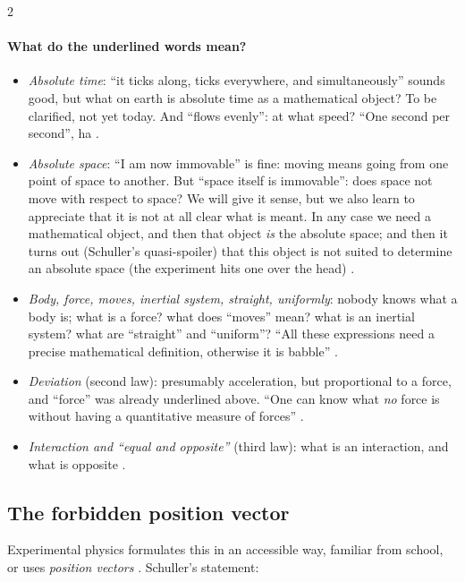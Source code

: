 \begin{paracol}{2}
\paragraph{What do the underlined words mean?}
\begin{itemize}
  \item \emph{Absolute time}: ``it ticks along, ticks everywhere, and simultaneously'' sounds good, but what on earth
        is absolute time as a mathematical object? To be clarified, not yet today. And ``flows evenly'': at what speed?
        ``One second per second'', ha .
  \item \emph{Absolute space}: ``I am now immovable'' is fine: moving means going from one point of space to another.
        But ``space itself is immovable'': does space not move with respect to space? We will give it sense, but we
        also learn to appreciate that it is not at all clear what is meant. In any case we need a mathematical object, and
        then that object \emph{is} the absolute space; and then it turns out (Schuller's quasi-spoiler) that this object
        is not suited to determine an absolute space (the experiment hits one over the head) .
  \item \emph{Body, force, moves, inertial system, straight, uniformly}: nobody knows what a body is; what is a force?
        what does ``moves'' mean? what is an inertial system? what are ``straight'' and ``uniform''? ``All these
        expressions need a precise mathematical definition, otherwise it is babble'' .
  \item \emph{Deviation} (second law): presumably acceleration, but proportional to a force, and ``force'' was already
        underlined above. ``One can know what \emph{no} force is without having a quantitative measure of forces''
        .
  \item \emph{Interaction and ``equal and opposite''} (third law): what is an interaction, and what is opposite
        .
\end{itemize}

\subsection{The forbidden position vector}\label{ssec:bv-position}

Experimental physics formulates this in an accessible way, familiar from school, or uses \emph{position vectors}
. Schuller's statement:


\end{paracol}
